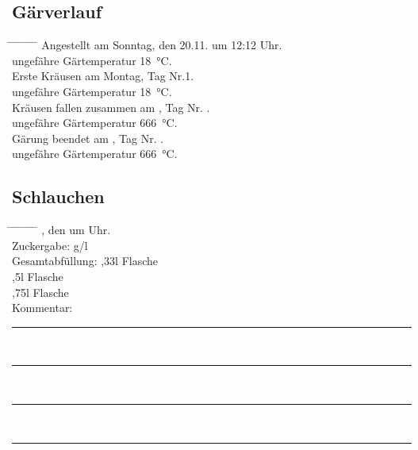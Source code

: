 \documentclass[12pt,oneside,a4paper]{scrartcl}
\begin{document}
\subsection*{Gärverlauf}
	\begin{tabbing}
		\hspace{1cm} \= \hspace{1cm} \= \hspace{1cm} \= \hspace{1cm} \= \hspace{1cm} \= \hspace{1cm} \= \hspace{1cm} \= \hspace{1cm} \= \kill
		\> Angestellt am Sonntag, den  20.11. um 12:12 Uhr.\\
		\> \> ungefähre Gärtemperatur \SI{18}{\celsius}.\\
		\> Erste Kräusen am Montag, Tag Nr.1.\\
		\> \> ungefähre Gärtemperatur \SI{18}{\celsius}.\\
		\> Kräusen fallen zusammen am \hspace{4cm}, Tag Nr. \hspace{2.5cm}.\\
		\> \> ungefähre Gärtemperatur \SI{666}{\celsius}.\\
		\> Gärung beendet am \hspace{4cm}, Tag Nr. \hspace{2.5cm}.\\
		\> \> ungefähre Gärtemperatur \SI{666}{\celsius}.
	\end{tabbing}
%
\subsection*{Schlauchen}
	\begin{tabbing}
		\hspace{1cm} \= \hspace{1cm} \= \hspace{1cm} \= \hspace{1cm} \= \hspace{1cm} \= \hspace{1cm} \= \hspace{1cm} \= \hspace{1cm} \= \kill
		\> \hspace{4cm}, den \hspace{4cm} um \hspace{2.5cm} Uhr.\\
		\> Zuckergabe: \hspace{3.2cm} g/l\\
		\> Gesamtabfüllung: \> \> \> \> ,33l Flasche\\
		\> \> \> \> \> ,5l Flasche\\
		\> \> \> \> \> ,75l Flasche\\
		\> Kommentar: \>\>\> \rule[-0.2cm]{13cm}{1pt}\\
		\> \>  \rule[-0.2cm]{15.3cm}{1pt}\\
		\> \>  \rule[-0.2cm]{15.3cm}{1pt}\\
		\> \>  \rule[-0.2cm]{15.3cm}{1pt}		
	\end{tabbing}
%
\end{document}
